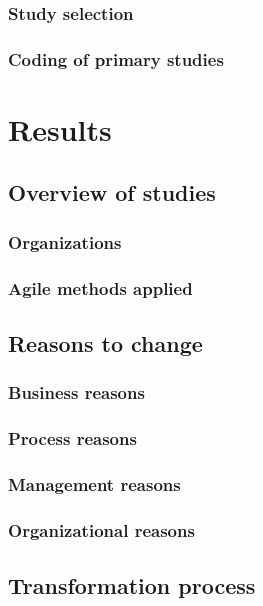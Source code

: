 \documentclass{article}
\begin{document}
\subsubsection{Study selection}

\subsubsection{Coding of primary studies}

\section{Results}

\subsection{Overview of studies}

\subsubsection{Organizations}

\subsubsection{Agile methods applied}

\subsection{Reasons to change}

\subsubsection{Business reasons}

\subsubsection{Process reasons}

\subsubsection{Management reasons}

\subsubsection{Organizational reasons}

\subsection{Transformation process}

\end{document}

